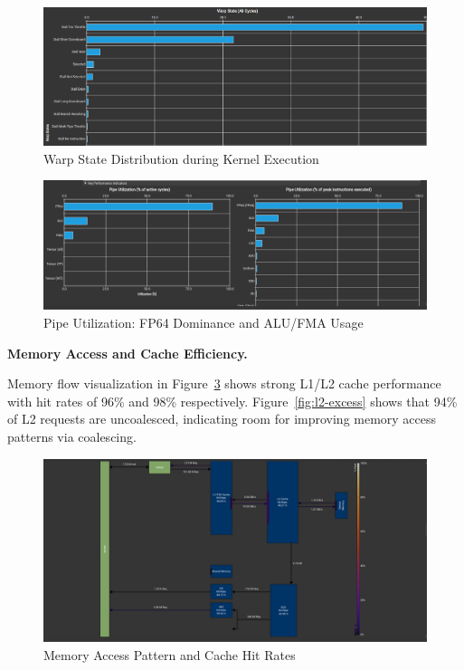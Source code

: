 \documentclass[conference, 10pt]{IEEEtran}
\begin{document}
\begin{figure}[H]
    \centering
    \includegraphics[width=0.95\linewidth]{figures/WarpState.png}
    \caption{Warp State Distribution during Kernel Execution}
    \label{fig:warp-states}
\end{figure}

\begin{figure}[H]
    \centering
    \includegraphics[width=0.95\linewidth]{figures/PipeUtilization.png}
    \caption{Pipe Utilization: FP64 Dominance and ALU/FMA Usage}
    \label{fig:pipe-utilization}
\end{figure}

\textbf{Memory Access and Cache Efficiency.}

Memory flow visualization in Figure~\ref{fig:memory-chart} shows strong L1/L2 cache performance with hit rates of 96\% and 98\% respectively.  
Figure~\ref{fig:l2-excess} shows that 94\% of L2 requests are uncoalesced, indicating room for improving memory access patterns via coalescing.

\begin{figure}[H]
    \centering
    \includegraphics[width=0.9\linewidth]{figures/MemoryChart.png}
    \caption{Memory Access Pattern and Cache Hit Rates}
    \label{fig:memory-chart}
\end{figure}
\end{document}
